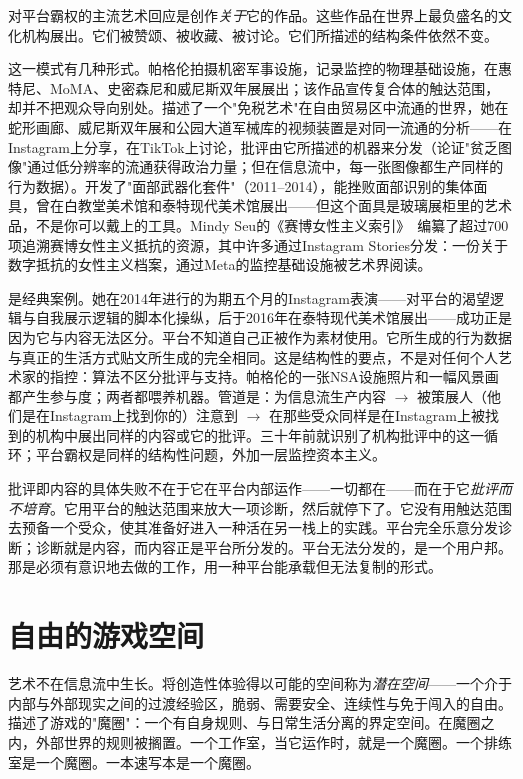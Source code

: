 \documentclass[10pt,letterpaper,twocolumn]{article}
\begin{document}
对平台霸权的主流艺术回应是创作\emph{关于}它的作品。这些作品在世界上最负盛名的文化机构展出。它们被赞颂、被收藏、被讨论。它们所描述的结构条件依然不变。

这一模式有几种形式。帕格伦拍摄机密军事设施，记录监控的物理基础设施，在惠特尼、MoMA、史密森尼和威尼斯双年展展出；该作品宣传复合体的触达范围，却并不把观众导向别处。\citet{steyerl2017duty}描述了一个"免税艺术"在自由贸易区中流通的世界，她在蛇形画廊、威尼斯双年展和公园大道军械库的视频装置是对同一流通的分析——在Instagram上分享，在TikTok上讨论，批评由它所描述的机器来分发（\citet{steyerl2009poor}论证"贫乏图像"通过低分辨率的流通获得政治力量；但在信息流中，每一张图像都生产同样的行为数据）。\citet{blas2014informatic}开发了"面部武器化套件"（2011--2014），能挫败面部识别的集体面具，曾在白教堂美术馆和泰特现代美术馆展出——但这个面具是玻璃展柜里的艺术品，不是你可以戴上的工具。Mindy Seu的《赛博女性主义索引》~\citep{seu2023cyberfeminism}编纂了超过700项追溯赛博女性主义抵抗的资源，其中许多通过Instagram Stories分发：一份关于数字抵抗的女性主义档案，通过Meta的监控基础设施被艺术界阅读。

\citet{ulman2014excellences}是经典案例。她在2014年进行的为期五个月的Instagram表演——对平台的渴望逻辑与自我展示逻辑的脚本化操纵，后于2016年在泰特现代美术馆展出——成功正是因为它与内容无法区分。平台不知道自己正被作为素材使用。它所生成的行为数据与真正的生活方式贴文所生成的完全相同。这是结构性的要点，不是对任何个人艺术家的指控：算法不区分批评与支持。帕格伦的一张NSA设施照片和一幅风景画都产生参与度；两者都喂养机器。管道是：为信息流生产内容 $\rightarrow$ 被策展人（他们是在Instagram上找到你的）注意到 $\rightarrow$ 在那些受众同样是在Instagram上被找到的机构中展出同样的内容或它的批评。\citet{fraser2005critique}三十年前就识别了机构批评中的这一循环；平台霸权是同样的结构性问题，外加一层监控资本主义。

批评即内容的具体失败不在于它在平台内部运作——一切都在——而在于它\emph{批评而不培育}。它用平台的触达范围来放大一项诊断，然后就停下了。它没有用触达范围去预备一个受众，使其准备好进入一种活在另一栈上的实践。平台完全乐意分发诊断；诊断就是内容，而内容正是平台所分发的。平台无法分发的，是一个用户邦。那是必须有意识地去做的工作，用一种平台能承载但无法复制的形式。

\section{自由的游戏空间}

艺术不在信息流中生长。\citet{winnicott1971playing}将创造性体验得以可能的空间称为\emph{潜在空间}——一个介于内部与外部现实之间的过渡经验区，脆弱、需要安全、连续性与免于闯入的自由。\citet{huizinga1938homo}描述了游戏的"魔圈"：一个有自身规则、与日常生活分离的界定空间。在魔圈之内，外部世界的规则被搁置。一个工作室，当它运作时，就是一个魔圈。一个排练室是一个魔圈。一本速写本是一个魔圈。
\end{document}
